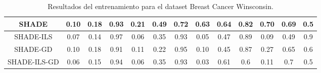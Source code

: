 \begin{table}[H]
{\begin{tabular}{|c|ccc|ccc|ccc|ccc|}
SHADE                                                & \multicolumn{1}{c|}{0.10}          & \multicolumn{1}{c|}{0.18}          & 0.93          & \multicolumn{1}{c|}{0.21}          & \multicolumn{1}{c|}{0.49}          & 0.72          & \multicolumn{1}{c|}{0.63}          & \multicolumn{1}{c|}{0.64}          & 0.82         & \multicolumn{1}{c|}{0.70}          & \multicolumn{1}{c|}{0.69}          & 0.5           \\ \hline
SHADE-ILS                                            & \multicolumn{1}{c|}{0.07}          & \multicolumn{1}{c|}{0.14}          & 0.97          & \multicolumn{1}{c|}{0.06}          & \multicolumn{1}{c|}{0.35}          & 0.93          & \multicolumn{1}{c|}{0.05}          & \multicolumn{1}{c|}{0.47}          & 0.89         & \multicolumn{1}{c|}{0.09}          & \multicolumn{1}{c|}{0.49}          & 0.9           \\ \hline
SHADE-GD                                             & \multicolumn{1}{c|}{0.10}          & \multicolumn{1}{c|}{0.18}          & 0.91          & \multicolumn{1}{c|}{0.11}          & \multicolumn{1}{c|}{0.22}          & 0.95          & \multicolumn{1}{c|}{0.10}          & \multicolumn{1}{c|}{0.45}          & 0.87         & \multicolumn{1}{c|}{0.27}          & \multicolumn{1}{c|}{0.65}          & 0.6           \\ \hline
SHADE-ILS-GD                                         & \multicolumn{1}{c|}{0.06}          & \multicolumn{1}{c|}{0.15}          & 0.94          & \multicolumn{1}{c|}{0.06}          & \multicolumn{1}{c|}{0.35}          & 0.93          & \multicolumn{1}{c|}{0.03}          & \multicolumn{1}{c|}{0.61}          & 0.6          & \multicolumn{1}{c|}{0.11}          & \multicolumn{1}{c|}{0.7}           & 0.5           \\ \hline
\end{tabular}}
\caption{Resultados del entrenamiento para el dataset Breast Cancer Winsconsin.}
\label{tab:bcw}
\end{table}



